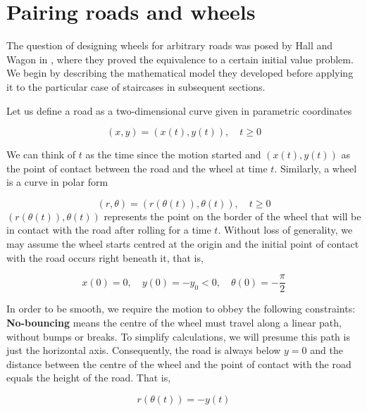 \documentclass{article}
\theoremstyle{theorem}
\theoremstyle{theorem}
\begin{document}
\section{Pairing roads and wheels }
\label{sec:model}

The question of designing wheels for arbitrary roads was posed by Hall
and Wagon in \cite{hall-wagon}, where they proved the equivalence to a
certain initial value problem. We begin by describing the mathematical
model they developed before applying it to the particular case of
staircases in subsequent sections.

Let us define a road as a two-dimensional curve given in parametric
coordinates

\begin{equation}
  \label{eq:road}
  (x, y) = (x(t), y(t)), \quad t \geq 0
\end{equation}

We can think of $t$ as the time since the motion started and $(x(t),
y(t))$ as the point of contact between the road and the wheel at time
$t$. Similarly, a wheel is a curve in polar form

\begin{equation}
  \label{eq:wheel}
  (r, \theta) = (r(\theta(t)), \theta(t)), \quad t \geq 0
\end{equation}
$(r(\theta(t)), \theta(t))$ represents the point on the border of the
wheel that will be in contact with the road after rolling for a time
$t$. Without loss of generality, we may assume the wheel starts
centred at the origin and the initial point of contact with the road
occurs right beneath it, that is,

\begin{equation}
  x(0)=0,\quad y(0)=-y_0 < 0, \quad \theta(0) = -\frac{\pi}{2}
\end{equation}

In order to be smooth, we require the motion to obbey the following constraints:\\

\noindent \textbf{No-bouncing} means the centre of the wheel must
travel along a linear path, without bumps or breaks. To simplify
calculations, we will presume this path is just the horizontal
axis. Consequently, the road is always below $y=0$ and the distance
between the centre of the wheel and the point of contact with the road
equals the height of the road. That is,

\begin{equation}
  \label{eq:no-bouncing}
  r(\theta(t)) = -y(t)
\end{equation}
\end{document}
